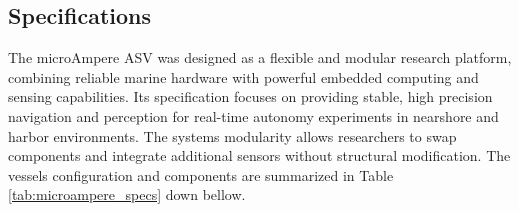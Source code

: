 \subsection{Specifications}

The microAmpere ASV was designed as a flexible and modular research platform, combining reliable marine hardware with powerful embedded computing and sensing capabilities. Its specification focuses on providing stable, high precision navigation and perception for real-time autonomy experiments in nearshore and harbor environments. The systems modularity allows researchers to swap components and integrate additional sensors without structural modification. The vessels configuration and components are summarized in Table \ref{tab:microampere_specs} down bellow.
